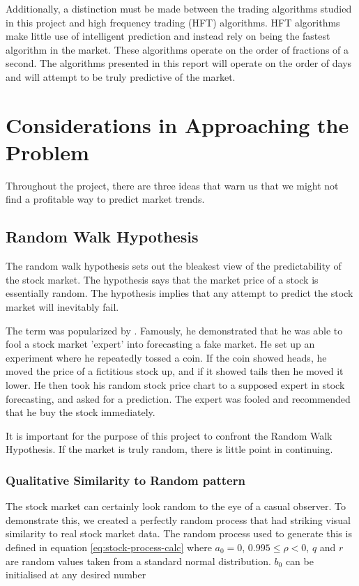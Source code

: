 \documentclass{report}
\begin{document}
Additionally, a distinction must be made between the trading algorithms studied in this project and high frequency trading (HFT) algorithms. HFT algorithms make little use of intelligent prediction and instead rely on being the fastest algorithm in the market. These algorithms operate on the order of fractions of a second. The algorithms presented in this report will operate on the order of days and will attempt to be truly predictive of the market.  

\chapter{Considerations in Approaching the Problem}

Throughout the project, there are three ideas that warn us that we might not find a profitable way to predict market trends.

\section{Random Walk Hypothesis}

The random walk hypothesis sets out the bleakest view of the predictability of the stock market. The hypothesis says that the market price of a stock is essentially random. The hypothesis implies that any attempt to predict the stock market will inevitably fail. 

The term was popularized by \citet{malkiel1999random}. Famously, he demonstrated that he was able to fool a stock market 'expert' into forecasting a fake market. He set up an experiment where he repeatedly tossed a coin. If the coin showed heads, he moved the price of a fictitious stock up, and if it showed tails then he moved it lower. He then took his random stock price chart to a supposed expert in stock forecasting, and asked for a prediction. The expert was fooled and recommended that he buy the stock immediately. 

It is important for the purpose of this project to confront the Random Walk Hypothesis. If the market is truly random, there is little point in continuing. 

\subsection{Qualitative Similarity to Random pattern}

The stock market can certainly look random to the eye of a casual observer. To demonstrate this, we created a perfectly random process that had striking visual similarity to real stock market data. The random process used to generate this is defined in equation \ref{eq:stock-process-calc} where $a_{0} = 0$, $0.995 \leq \rho < 0$, $q$ and $r$ are random values taken from a standard normal distribution. $b_{0}$ can be initialised at any desired number
\end{document}
